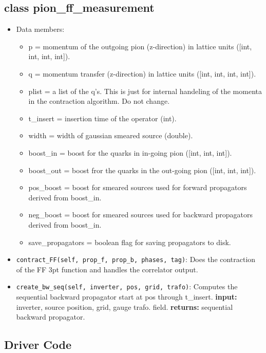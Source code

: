 \documentclass[a4paper,10pt]{scrartcl}
\begin{document}
\subsection{class pion\_ff\_measurement}
\begin{itemize}
    \item Data members:
        \begin{itemize}
            \item p = momentum of the outgoing pion (z-direction) in lattice units ([int, int, int, int]).
            \item q = momentum transfer (z-direction) in lattice units ([int, int, int, int]).
            \item plist = a list of the q's. This is just for internal handeling of the momenta in the contraction algorithm. Do not change.
            \item t\_insert = insertion time of the operator (int).
            \item width = width of gaussian smeared source (double).
            \item boost\_in = boost for the quarks in in-going pion ([int, int, int]).   
            \item boost\_out = boost fror the quarks in the out-going pion ([int, int, int]).
            \item pos\_boost = boost for smeared sources used for forward propagators derived from boost\_in.
            \item neg\_boost = boost for smeared sources used for backward propagators derived from boost\_in.
            \item save\_propagators = boolean flag for saving propagators to disk.
        \end{itemize}
    \item \lstinline{contract_FF(self, prop_f, prop_b, phases, tag)}: Does the contraction of the FF 3pt function and handles the correlator output.
    \item \lstinline{create_bw_seq(self, inverter, pos, grid, trafo)}: Computes the sequential backward propagator start at pos through t\_insert. 
            \newline \textbf{input:} inverter, source position, grid, gauge trafo. field.
            \newline \textbf{returns:} sequential backward propagator.
\end{itemize}

\subsection{Driver Code}
\end{document}
